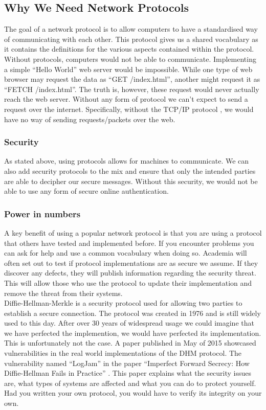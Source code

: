 \subsection{Why We Need Network Protocols}
The goal of a network protocol is to allow computers to have a standardised way of communicating with each other. This protocol gives us a shared vocabulary as it contains the definitions for the various aspects contained within the protocol. Without protocols, computers would not be able to communicate. Implementing a simple ``Hello World'' web server would be impossible. While one type of web browser may request the data as ``GET /index.html'', another might request it as ``FETCH /index.html''. The truth is, however, these request would never actually reach the web server. Without any form of protocol we can't expect to send a request over the internet. Specifically, without the TCP/IP protocol \cite{clark1988design}, we would have no way of sending requests/packets over the web.

\subsubsection{Security}
As stated above, using protocols allows for machines to communicate. We can also add security protocols to the mix and ensure that only the intended parties are able to decipher our secure messages. Without this security, we would not be able to use any form of secure online authentication.

\subsubsection{Power in numbers}
A key benefit of using a popular network protocol is that you are using a protocol that others have tested and implemented before. If you encounter problems you can ask for help and use a common vocabulary when doing so. Academia will often set out to test if protocol implementations are as secure we assume. If they discover any defects, they will publish information regarding the security threat. This will allow those who use the protocol to update their implementation and remove the threat from their systems.
\\
Diffie-Hellman-Merkle \cite{diffie1976new} is a security protocol used for allowing two parties to establish a secure connection. The protocol was created in 1976 and is still widely used to this day. After over 30 years of widespread usage we could imagine that we have perfected the implemention, we would have perfected its implementation. This is unfortunately not the case. A paper published in May of 2015 showcased vulnerabilities in the real world implementations of the DHM protocol. The vulnerability named ``LogJam'' in the paper ``Imperfect Forward Secrecy: How Diffie-Hellman Fails in Practice'' \cite{logjam2015}. This paper explains what the security issues are, what types of systems are affected and what you can do to protect yourself. Had you written your own protocol, you would have to verify its integrity on your own.  

